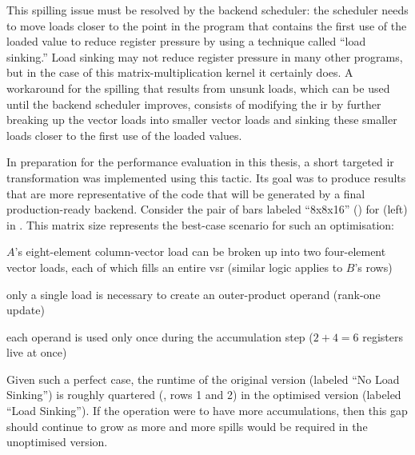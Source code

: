 \documentclass[\main/thesis.tex]{subfiles}
\begin{document}
This spilling issue must be resolved by the backend scheduler: the scheduler needs to move loads closer to the \gls{point} in the program that contains the first use of the loaded value to reduce register pressure by using a technique called ``load sinking.''\footnotemark
{}
Load sinking may not reduce register pressure in many other programs, but in the case of this matrix-multiplication kernel it certainly does.
A workaround for the spilling that results from unsunk loads, which can be used until the backend scheduler improves, consists of modifying the \gls{ir} by further breaking up the vector loads into smaller vector loads and sinking these smaller loads closer to the first use of the loaded values.

In preparation for the performance evaluation in this thesis, a short targeted \gls{ir} transformation was implemented using this tactic.
Its goal was to produce results that are more representative of the code that will be generated by a final production-ready backend.
Consider the pair of bars labeled ``8x8x16'' () for  (left) in .
This matrix size represents the best-case scenario for such an optimisation:
\begin{enumerate*}[itemjoin={{; }}, itemjoin*={{; and }}, label={\protect\circled{\arabic*}}, after={.}]
  \item $A$'s eight-element column-vector load can be broken up into two four-element vector loads, each of which fills an entire \gls{vsr} (similar logic applies to $B$'s rows)
  \item only a single load is necessary to create an outer-product operand (rank-one update)
  \item each operand is used only once during the accumulation step ($2+4=6$ registers \gls{live} at once)
\end{enumerate*}
Given such a perfect case, the runtime of the original version (labeled ``No Load Sinking'') is roughly quartered (, rows 1 and 2) in the optimised version (labeled ``Load Sinking'').
If the operation were to have more accumulations, then this gap should continue to grow as more and more spills would be required in the unoptimised version.
\end{document}
